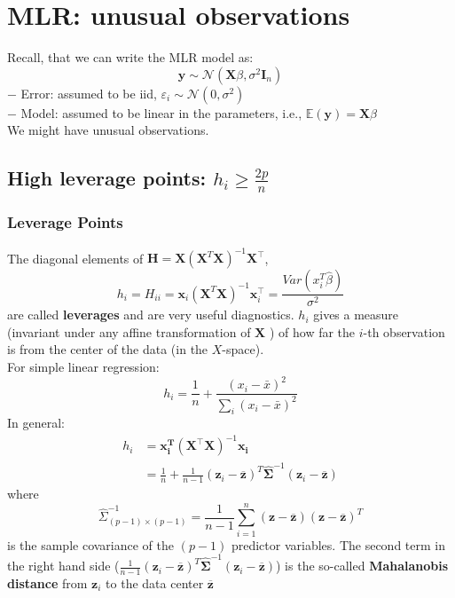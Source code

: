 \documentclass[11pt,a4paper]{article}
\begin{document}
\section{MLR: unusual observations}
Recall, that we can write the MLR model as:
$$
\mathbf{y} \sim \mathcal{N}\left(\mathbf{X} \beta, \sigma^{2} \mathbf{I}_{n}\right)
$$
$-$ Error: assumed to be iid, $\varepsilon_{i} \sim \mathcal{N}\left(0, \sigma^{2}\right)$\\
$-$ Model: assumed to be linear in the parameters, i.e., $\mathbb{E}(\mathbf{y})=\mathbf{X} \beta$\\
We might have unusual observations.




\subsection{High leverage points: $h_i\geq \frac{2p}{n}$}
\subsubsection{Leverage Points}
The diagonal elements of $\mathbf{H}=\mathbf{X}\left(\mathbf{X}^{T} \mathbf{X}\right)^{-1} \mathbf{X}^{\top}$,
$$
h_{i}=H_{i i}=\mathbf{x}_i\left(\mathbf{X}^{T} \mathbf{X}\right)^{-1} \mathbf{x}_i^{\top}=\frac{Var(x_i^T \hat{\beta})}{\sigma^2}
$$
are called \textbf{leverages} and are very useful diagnostics.
$h_{i}$ gives a measure (invariant under any affine transformation of $\mathbf{X}$ ) of how far the $i$-th observation is from the center of the data (in the $X$-space).\\
For simple linear regression:
$$
h_{i}=\frac{1}{n}+\frac{\left(x_{i}-\bar{x}\right)^{2}}{\sum_{i}\left(x_{i}-\bar{x}\right)^{2}}
$$
In general:
$$
\begin{aligned}
h_{i} &=\mathbf{x}_{\mathbf{i}}^{\boldsymbol{T}}\left(\mathbf{X}^{\top} \mathbf{X}\right)^{-1} \mathbf{x}_{\mathbf{i}} \\
&=\frac{1}{n}+\frac{1}{n-1}\left(\mathbf{z}_{i}-\overline{\mathbf{z}}\right)^{T} \hat{\boldsymbol{\Sigma}}^{-1}\left(\mathbf{z}_{i}-\overline{\mathbf{z}}\right)
\end{aligned}
$$
where
$$
\hat{\Sigma}_{(p-1) \times(p-1)}^{-1}=\frac{1}{n-1} \sum_{i=1}^{n}(\mathbf{z}-\overline{\mathbf{z}})(\mathbf{z}-\overline{\mathbf{z}})^{T}
$$
is the sample covariance of the $(p-1)$ predictor variables. The second term in the right hand side ($\frac{1}{n-1}\left(\mathbf{z}_{i}-\overline{\mathbf{z}}\right)^{T} \hat{\boldsymbol{\Sigma}}^{-1}\left(\mathbf{z}_{i}-\overline{\mathbf{z}}\right)$) is the so-called \textbf{Mahalanobis distance} from $\mathbf{z}_{i}$ to the data center $\overline{\mathbf{z}}$
\end{document}
